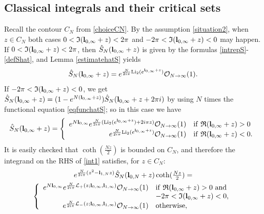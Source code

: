 \documentclass[11pt]{amsart}
\newcommand{\bl}{{\bf l}}
\newcommand{\ra}{\rightarrow}
\begin{document}
{\subsection{Classical integrals and their critical sets}\label{sec:class_int} Recall the contour $C_N$ from  \eqref{choiceCN}. By the assumption \eqref{situation2}, when $z\in C_N$ both cases $0< \mathfrak{I}(\bl_{0,\infty}+z) < 2\pi$ and $-2\pi < \mathfrak{I}(\bl_{0,\infty}+z) < 0$ may happen. If $0< \mathfrak{I}(\bl_{0,\infty}+z) < 2\pi$, then $\hat S_N(\bl_{0,\infty}+z)$ is given by the formulas \eqref{intrepS}-\eqref{defShat}, and Lemma \ref{estimatehatS} yields
\begin{equation}\label{equiv1}
\hat S_N(\bl_{0,\infty} + z)= e^{\frac{N}{2i\pi} {\rm Li}_2(e^{\bl_{0,\infty} + z})}\mathcal{O}_{N\ra \infty}(1).
\end{equation}
If $-2\pi < \mathfrak{I}(\bl_{0,\infty}+z) < 0$, we get $\hat S_N(\bl_{0,\infty}+z) = (1-e^{N(\bl_{0,\infty}+z)})\hat S_N(\bl_{0,\infty}+z+2\pi i)$ by using $N$ times the functional equation \eqref{eqfunchatS}; so in this case we have 
\begin{equation}\label{equiv2}
\hat S_N(\bl_{0,\infty} + z)= \left\lbrace \begin{array}{rl} e^{N\bl_{0,\infty}}e^{\frac{N}{2i\pi} ({\rm Li}_2(e^{\bl_{0,\infty} + z})+2i\pi z)}\mathcal{O}_{N\ra \infty}(1) & {\rm if}\ \mathfrak{R}(\bl_{0,\infty} + z)>0\\ e^{\frac{N}{2i\pi} {\rm Li}_2(e^{\bl_{0,\infty} + z})}\mathcal{O}_{N\ra \infty}(1) & {\rm if}\ \mathfrak{R}(\bl_{0,\infty} + z)<0. \end{array}\right.
\end{equation}
It is easily checked that $\textstyle \coth(\frac{Nz}{2})$ is bounded on $C_N$, and therefore the integrand on the RHS of \eqref{int1} satisfies, for $z\in C_N$: 
\begin{multline}\label{equiv3mars26}
e^{\frac{N}{2i\pi}(z^2 - \bl_{1,N}z)}\hat S_N(\bl_{0,N} + z)\textstyle \coth(\frac{Nz}{2}) =\\ \left\lbrace \begin{array}{rl} e^{N\bl_{0,\infty}}e^{\frac{N}{2i\pi} \mathcal{L}_+(z;\bl_{0,\infty},\bl_{1,\infty})}\mathcal{O}_{N\ra \infty}(1) & {\rm if}\ \mathfrak{R}(\bl_{0,\infty} + z)>0 \ {\rm and}\\
& -2\pi < \mathfrak{I}(\bl_{0,\infty}+z) < 0,\\ e^{\frac{N}{2i\pi} \mathcal{L}_-(z;\bl_{0,\infty},\bl_{1,\infty})}\mathcal{O}_{N\ra \infty}(1) & {\rm otherwise}, \end{array}\right. 

\end{multline}}
\end{document}
